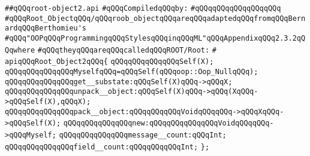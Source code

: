 \label{src/lib/src/root-object2.api}
\verb|##qQQqroot-object2.api|\newline
\newline
\verb|#qQQqCompiledqQQqby:|\newline
\verb|#qQQqqQQqqQQqqQQqqQQq|\newline
\newline
\verb|#qQQqRoot_ObjectqQQq/qQQqroob_objectqQQqareqQQqadaptedqQQqfromqQQqBernardqQQqBerthomieu's|\newline
\verb|#qQQq"OOPqQQqProgrammingqQQqStylesqQQqinqQQqML"qQQqAppendixqQQq2.3.2qQQqwhere|\newline
\verb|#qQQqtheyqQQqareqQQqcalledqQQqROOT/Root:|\newline
\verb|#|\newline
\verb|apiqQQqRoot_Object2qQQq{|\newline
\newline
\verb|qQQqqQQqqQQqqQQqSelf(X);|\newline
\verb|qQQqqQQqqQQqqQQqMyselfqQQq=qQQqSelf(qQQqoop::Oop_NullqQQq);|\newline
\newline
\verb|qQQqqQQqqQQqqQQqget__substate:qQQqSelf(X)qQQq->qQQqX;|\newline
\verb|qQQqqQQqqQQqqQQqunpack__object:qQQqSelf(X)qQQq->qQQq(XqQQq->qQQqSelf(X),qQQqX);|\newline
\verb|qQQqqQQqqQQqqQQqpack__object:qQQqqQQqqQQqVoidqQQqqQQq->qQQqXqQQq->qQQqSelf(X);|\newline
\verb|qQQqqQQqqQQqqQQqnew:qQQqqQQqqQQqqQQqVoidqQQqqQQq->qQQqMyself;|\newline
\newline
\verb|qQQqqQQqqQQqqQQqmessage__count:qQQqInt;|\newline
\verb|qQQqqQQqqQQqqQQqfield__count:qQQqqQQqqQQqInt;|\newline
\verb|};|\newline
\newline

